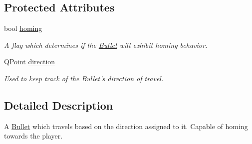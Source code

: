 \subsection*{Protected Attributes}
\begin{DoxyCompactItemize}
\item 
\hypertarget{classBullet_a9e84db7ee7fd067b050b1e4990149121}{
bool \hyperlink{classBullet_a9e84db7ee7fd067b050b1e4990149121}{homing}}
\label{classBullet_a9e84db7ee7fd067b050b1e4990149121}

\begin{DoxyCompactList}\small\item\em A flag which determines if the \hyperlink{classBullet}{Bullet} will exhibit homing behavior. \end{DoxyCompactList}\item 
\hypertarget{classBullet_a6f7f13888018bc38f754f95412ad383a}{
QPoint \hyperlink{classBullet_a6f7f13888018bc38f754f95412ad383a}{direction}}
\label{classBullet_a6f7f13888018bc38f754f95412ad383a}

\begin{DoxyCompactList}\small\item\em Used to keep track of the Bullet's direction of travel. \end{DoxyCompactList}\end{DoxyCompactItemize}


\subsection{Detailed Description}
A \hyperlink{classBullet}{Bullet} which travels based on the direction assigned to it. Capable of homing towards the player. 

